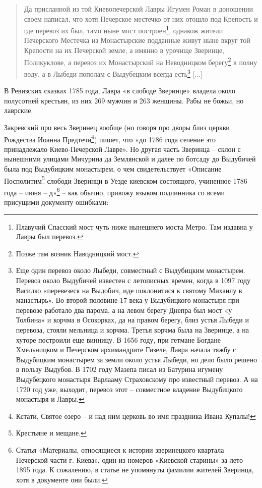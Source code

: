 \begin{quotation}
Да присланной из той Киевопечерской Лавры Игумен Роман в доношении своем написал, что хотя Печерское местечко от них отошло под Крепость и где перевоз их был, тамо ныне мост построен\footnote{Плавучий Спасский мост чуть ниже нынешнего моста Метро. Там издавна у Лавры был перевоз.}, однакож жители Печерского Местечка из Монастырские подданные живут ныне вкруг той Крепости на их Печерской земле, а имянно в урочище Зверинце, Поликуклове, а перевоз их Монастырский на Неводницком берегу\footnote{Позже там возник Наводницкий мост.} в полну воду, а в Лыбеди пополам с Выдубецким всегда есть\footnote{Еще один перевоз около Лыбеди, совместный с Выдубицким монастырем. Перевоз около Выдубичей известен с летописных времен, когда в 1097 году Василко «перевезеся на Выдобич, иде поклонитися к святому Михаилу в манастырь». Во второй половине 17 века у Выдубицкого монастыря при перевозе работало два парома, а на левом берегу Днепра был мост «у Толбина» и корчма в Осокорках, да на правом берегу, близ устья Лыбеди и перевоза, стояли мельница и корчма. Третья корчма была на Зверинце, а на хуторе построили еще винницу. В 1656 году, при гетмане Богдане Хмельницком и Печерском архимандрите Гизеле, Лавра начала тяжбу с Выдубицким монастырем за земли около устья Лыбеди, но дело было решено в пользу Выдубов. В 1702 году Мазепа писал из Батурина игумену Выдубецкого монастыря Варлааму Страховскому про известный перевоз. А на 1720 год уже, выходит, перевоз этот – совместное владение Выдубицкого монастыря и Лавры.} [...]
\end{quotation}
 
В Ревизских сказках 1785 года, Лавра «в слободе Зверинце» владела около полусотней крестьян, из них 269 мужчин и 263 женщины. Рабы не божьи, но лаврские.

Закревский про весь Зверинец вообще (но говоря про дворы близ церкви Рождества Иоанна Предтечи\footnote{Кстати, Святое озеро – и над ним церковь во имя праздника Ивана Купалы!}) пишет, что «до 1786 года селение это принадлежало Киево-Печерской Лавре». Но другая часть Зверинца – склон с нынешними улицами Мичурина да Землянской и далее по ботсаду до Выдубичей была под Выдубицким монастырем, о чем свидетельствует «Описание Посполитим\footnote{Крестьяне и мещане.} слободи Зверинци в Уезде киевском состоящого, учиненное 1786 года – июня – д»\footnote{Статья «Материалы, относящиеся к истории зверинецкого квартала Печерской части г. Киева», один из номеров «Киевской старины» за лето 1895 года. К сожалению, в статье не упомянуты фамилии жителей Зверинца, хотя в документе они были.} – как обычно, привожу языком подлинника со всеми присущими документу ошибками:

